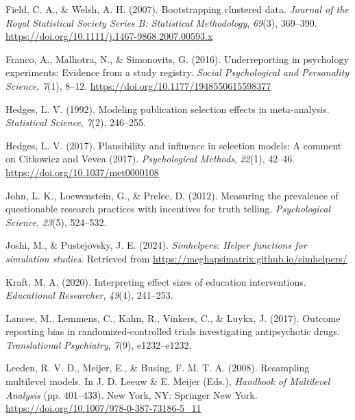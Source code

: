 \documentclass[
  man, donotrepeattitle,floatsintext]{apa7}
\newlength{\cslhangindent}
\newenvironment{CSLReferences}[2] %
 {\begin{list}{}{%
  \setlength{\itemindent}{0pt}
  \setlength{\leftmargin}{0pt}
  \setlength{\parsep}{0pt}
  \ifodd #1
   \setlength{\leftmargin}{\cslhangindent}
   \setlength{\itemindent}{-1\cslhangindent}
  \fi
  \setlength{\itemsep}{#2\baselineskip}}}
 {\end{list}}
\begin{document}
\begin{CSLReferences}{1}{0}
Field, C. A., \& Welsh, A. H. (2007). Bootstrapping clustered data. \emph{Journal of the Royal Statistical Society Series B: Statistical Methodology}, \emph{69}(3), 369--390. \url{https://doi.org/10.1111/j.1467-9868.2007.00593.x}

Franco, A., Malhotra, N., \& Simonovits, G. (2016). Underreporting in psychology experiments: Evidence from a study registry. \emph{Social Psychological and Personality Science}, \emph{7}(1), 8--12. \url{https://doi.org/10.1177/1948550615598377}

Hedges, L. V. (1992). Modeling publication selection effects in meta-analysis. \emph{Statistical Science}, \emph{7}(2), 246--255.

Hedges, L. V. (2017). Plausibility and influence in selection models: {A} comment on {Citkowicz} and {Vevea} (2017). \emph{Psychological Methods}, \emph{22}(1), 42--46. \url{https://doi.org/10.1037/met0000108}

John, L. K., Loewenstein, G., \& Prelec, D. (2012). Measuring the prevalence of questionable research practices with incentives for truth telling. \emph{Psychological Science}, \emph{23}(5), 524--532.

Joshi, M., \& Pustejovsky, J. E. (2024). \emph{Simhelpers: Helper functions for simulation studies}. Retrieved from \url{https://meghapsimatrix.github.io/simhelpers/}

Kraft, M. A. (2020). Interpreting effect sizes of education interventions. \emph{Educational Researcher}, \emph{49}(4), 241--253.

Lancee, M., Lemmens, C., Kahn, R., Vinkers, C., \& Luykx, J. (2017). Outcome reporting bias in randomized-controlled trials investigating antipsychotic drugs. \emph{Translational Psychiatry}, \emph{7}(9), e1232--e1232.

Leeden, R. V. D., Meijer, E., \& Busing, F. M. T. A. (2008). Resampling multilevel models. In J. D. Leeuw \& E. Meijer (Eds.), \emph{Handbook of {Multilevel} {Analysis}} (pp. 401--433). New York, NY: Springer New York. \url{https://doi.org/10.1007/978-0-387-73186-5_11}


\end{CSLReferences}
\end{document}
